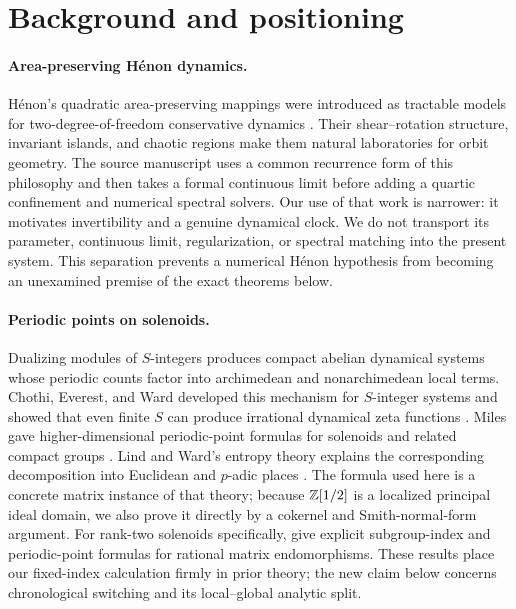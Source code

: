 \section{Background and positioning}
\label{sec:background}

\paragraph{Area-preserving H\'enon dynamics.}
H\'enon's quadratic area-preserving mappings were introduced as tractable
models for two-degree-of-freedom conservative dynamics
\citep{Henon1969}.  Their shear--rotation structure, invariant islands, and
chaotic regions make them natural laboratories for orbit geometry.  The
source manuscript \citep{Wang2026AreaPreservingHenon} uses a common recurrence
form of this philosophy and then takes a formal continuous limit before
adding a quartic confinement and numerical spectral solvers.  Our use of that
work is narrower: it motivates invertibility and a genuine dynamical clock.
We do not transport its parameter, continuous limit, regularization, or
spectral matching into the present system.  This separation prevents a
numerical H\'enon hypothesis from becoming an unexamined premise of the exact
theorems below.

\paragraph{Periodic points on solenoids.}
Dualizing modules of \(S\)-integers produces compact abelian dynamical
systems whose periodic counts factor into archimedean and nonarchimedean
local terms.  Chothi, Everest, and Ward developed this mechanism for
\(S\)-integer systems and showed that even finite \(S\) can produce
irrational dynamical zeta functions \citep{ChothiEverestWard1997}.  Miles
gave higher-dimensional periodic-point formulas for solenoids and related
compact groups \citep{Miles2008}.  Lind and Ward's entropy theory explains
the corresponding decomposition into Euclidean and \(p\)-adic places
\citep{LindWard1988}.  The formula used here is a concrete matrix instance of
that theory; because \(\mathbb{Z}[1/2]\) is a localized principal ideal domain, we
also prove it directly by a cokernel and Smith-normal-form argument.
For rank-two solenoids specifically, \citet{HaLee2023} give explicit
subgroup-index and periodic-point formulas for rational matrix
endomorphisms.  These results place our fixed-index calculation firmly in
prior theory; the new claim below concerns chronological switching and its
local--global analytic split.

